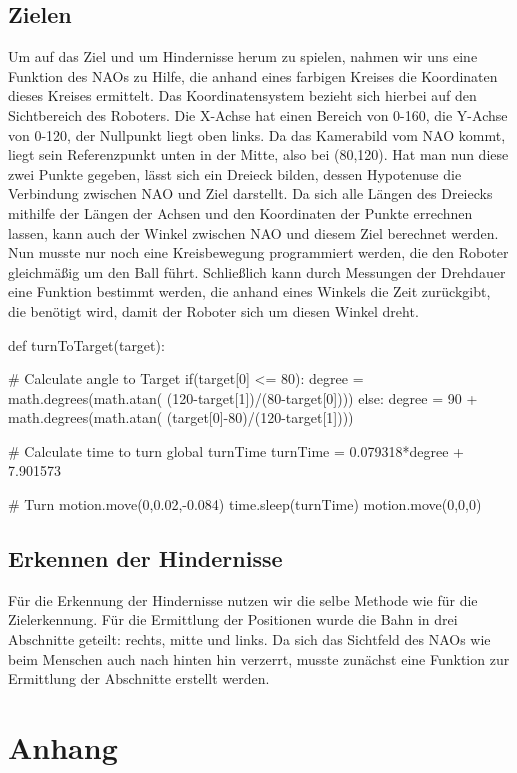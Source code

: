 \documentclass{scrartcl}
\begin{document}
\subsection{Zielen}

Um auf das Ziel und um Hindernisse herum zu spielen, nahmen wir uns eine Funktion des NAOs zu Hilfe, die anhand eines farbigen Kreises die Koordinaten dieses Kreises ermittelt. Das Koordinatensystem bezieht sich hierbei auf den Sichtbereich des Roboters. Die X-Achse  
hat einen Bereich von 0-160, die Y-Achse von 0-120, der Nullpunkt liegt oben links. Da das Kamerabild vom NAO kommt, liegt sein Referenzpunkt unten in der Mitte, also bei (80,120). Hat man nun diese zwei Punkte gegeben, lässt sich ein Dreieck bilden, dessen Hypotenuse die Verbindung zwischen NAO und Ziel darstellt. Da sich alle Längen des Dreiecks mithilfe der Längen der Achsen und den Koordinaten der Punkte errechnen lassen, kann auch der Winkel zwischen NAO und diesem Ziel berechnet werden. Nun musste nur noch eine Kreisbewegung programmiert werden, die den Roboter gleichmäßig um den Ball führt. Schließlich kann durch Messungen der Drehdauer eine Funktion bestimmt werden, die anhand eines Winkels die Zeit zurückgibt, die benötigt wird, damit der Roboter sich um diesen Winkel dreht.\\


\begin{python}
def turnToTarget(target):

    # Calculate angle to Target
    if(target[0] <= 80):
        degree = math.degrees(math.atan(
        	(120-target[1])/(80-target[0])))
    else:
        degree = 90 + math.degrees(math.atan(
        (target[0]-80)/(120-target[1])))

    # Calculate time to turn
    global turnTime
    turnTime = 0.079318*degree + 7.901573

    # Turn
    motion.move(0,0.02,-0.084)
    time.sleep(turnTime)
    motion.move(0,0,0)
\end{python}
 
\subsection{Erkennen der Hindernisse}

Für die Erkennung der Hindernisse nutzen wir die selbe Methode wie für die Zielerkennung. Für die Ermittlung der Positionen wurde die Bahn in drei Abschnitte geteilt: rechts, mitte und links.  Da sich das Sichtfeld des NAOs wie beim Menschen auch nach hinten hin verzerrt, musste zunächst eine Funktion zur Ermittlung der Abschnitte erstellt werden. 





  
\appendix 
\section{Anhang}

 

 
 
\end{document}
